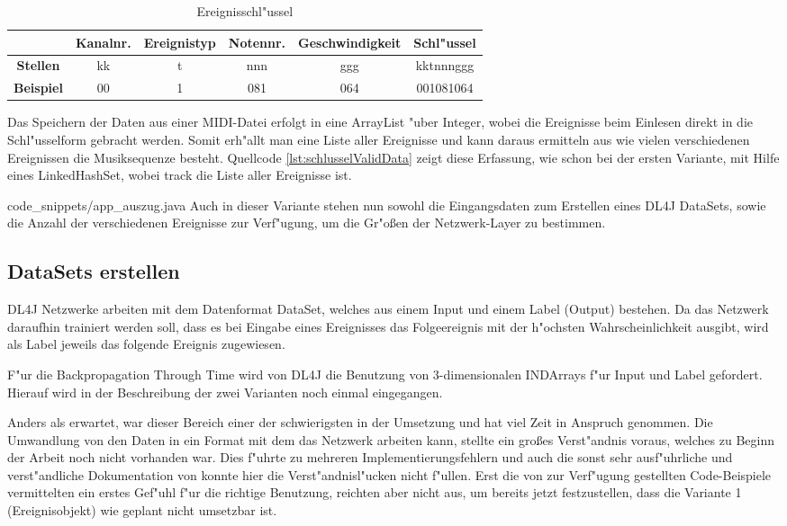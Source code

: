 {\begin{table} [h]
\centering
\begin{tabular}{|c|c|c|c|c|c|}\hline
   & \textbf{Kanalnr.} & \textbf{Ereignistyp} & \textbf{Notennr.} & \textbf{Geschwindigkeit}& \textbf{Schl"ussel}\\ \hline
  \textbf{Stellen} & kk & t & nnn & ggg & kktnnnggg\\ \hline
  \textbf{Beispiel} & 00 & 1 & 081 & 064 & 001081064\\ \hline
 \end{tabular}
\caption{Ereignisschl"ussel}
\label{tbl:eventKey}
\end{table}

Das Speichern der Daten aus einer MIDI-Datei erfolgt in eine ArrayList "uber Integer, wobei die Ereignisse beim Einlesen direkt in die Schl"usselform gebracht werden. Somit erh"allt man eine Liste aller Ereignisse und kann daraus ermitteln aus wie vielen verschiedenen Ereignissen die Musiksequenze besteht. Quellcode \ref{lst:schlusselValidData} zeigt diese Erfassung, wie schon bei der ersten Variante, mit Hilfe eines LinkedHashSet, wobei {\glqq}track{\grqq} die Liste aller Ereignisse ist.

{code_snippets/app_auszug.java}
Auch in dieser Variante stehen nun sowohl die Eingangsdaten zum Erstellen eines DL4J DataSets, sowie die Anzahl der verschiedenen Ereignisse zur Verf"ugung, um die Gr"o{\ss}en der Netzwerk-Layer zu bestimmen.


\subsection{DataSets erstellen}
DL4J Netzwerke arbeiten mit dem Datenformat DataSet, welches aus einem Input und einem Label (Output) bestehen. Da das Netzwerk daraufhin trainiert werden soll, dass es bei Eingabe eines Ereignisses das Folgeereignis mit der h"ochsten Wahrscheinlichkeit ausgibt, wird als Label jeweils das folgende Ereignis zugewiesen.

F"ur die Backpropagation Through Time wird von DL4J die Benutzung von 3-dimensionalen INDArrays f"ur Input und Label gefordert. Hierauf wird in der Beschreibung der zwei Varianten noch einmal eingegangen.

Anders als erwartet, war dieser Bereich einer der schwierigsten in der Umsetzung und hat viel Zeit in Anspruch genommen. Die Umwandlung von den Daten in ein Format mit dem das Netzwerk arbeiten kann, stellte ein gro{\ss}es Verst"andnis voraus, welches zu Beginn der Arbeit noch nicht vorhanden war. Dies f"uhrte zu mehreren Implementierungsfehlern und auch die sonst sehr ausf"uhrliche und verst"andliche Dokumentation von \cite{DL4J} konnte hier die Verst"andnisl"ucken nicht f"ullen. Erst die von \cite{DL4J} zur Verf"ugung gestellten Code-Beispiele vermittelten ein erstes Gef"uhl f"ur die richtige Benutzung, reichten aber nicht aus, um bereits jetzt festzustellen, dass die Variante 1 (Ereignisobjekt) wie geplant nicht umsetzbar ist.

}

